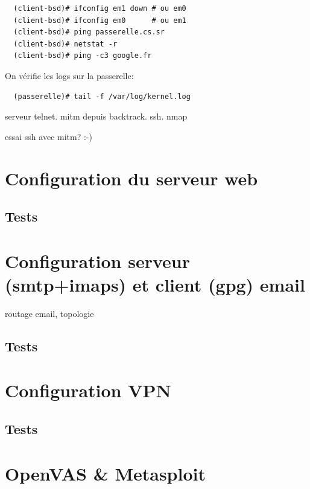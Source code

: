 \documentclass[a4paper]{article}
\begin{document}
\begin{verbatim}
  (client-bsd)# ifconfig em1 down # ou em0
  (client-bsd)# ifconfig em0      # ou em1
  (client-bsd)# ping passerelle.cs.sr
  (client-bsd)# netstat -r 
  (client-bsd)# ping -c3 google.fr
\end{verbatim}

On vérifie les logs sur la passerelle:
\begin{verbatim}
  (passerelle)# tail -f /var/log/kernel.log
\end{verbatim}

serveur telnet. mitm depuis backtrack. ssh. nmap

essai ssh avec mitm? :-)

\section{Configuration du serveur web}
\subsection{Tests}

\section{Configuration serveur (smtp+imaps) et client (gpg) email}
routage email, topologie
\subsection{Tests}

\section{Configuration VPN}
\subsection{Tests}

\section{OpenVAS \& Metasploit}
\end{document}
